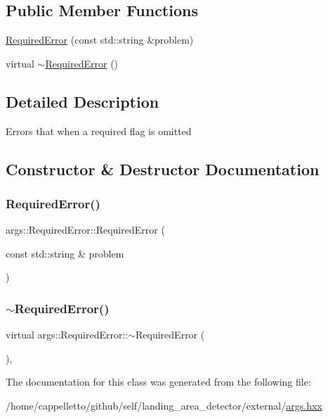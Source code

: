\subsection*{Public Member Functions}
\begin{DoxyCompactItemize}
\item 
\hyperlink{classargs_1_1_required_error_a51779d59660b0585b973feec6a972090}{Required\+Error} (const std\+::string \&problem)
\item 
virtual \hyperlink{classargs_1_1_required_error_a72b41b0d7578fb4baa263e0fc3d76b68}{$\sim$\+Required\+Error} ()
\end{DoxyCompactItemize}


\subsection{Detailed Description}
Errors that when a required flag is omitted 

\subsection{Constructor \& Destructor Documentation}
\mbox{\label{classargs_1_1_required_error_a51779d59660b0585b973feec6a972090}} 
\subsubsection{\texorpdfstring{Required\+Error()}{RequiredError()}}
{\footnotesize\ttfamily args\+::\+Required\+Error\+::\+Required\+Error (\begin{DoxyParamCaption}\item[{const std\+::string \&}]{problem }\end{DoxyParamCaption})\hspace{0.3cm}{\ttfamily [inline]}}

\mbox{\label{classargs_1_1_required_error_a72b41b0d7578fb4baa263e0fc3d76b68}} 
\subsubsection{\texorpdfstring{$\sim$\+Required\+Error()}{~RequiredError()}}
{\footnotesize\ttfamily virtual args\+::\+Required\+Error\+::$\sim$\+Required\+Error (\begin{DoxyParamCaption}{ }\end{DoxyParamCaption})\hspace{0.3cm}{\ttfamily [inline]}, {\ttfamily [virtual]}}



The documentation for this class was generated from the following file\+:\begin{DoxyCompactItemize}
\item 
/home/cappelletto/github/self/landing\+\_\+area\+\_\+detector/external/\hyperlink{args_8hxx}{args.\+hxx}\end{DoxyCompactItemize}
